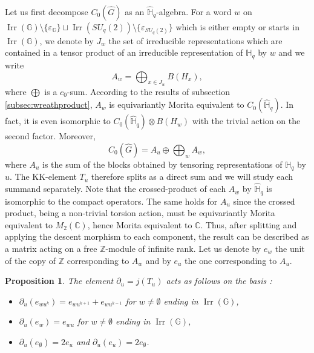 \documentclass[a4paper, 11pt]{amsart}
\theoremstyle{plain}
\newtheorem{prop}[thm]{Proposition}
\theoremstyle{definition}
\theoremstyle{remark}
\DeclareMathOperator{\Irr}{Irr}
\newcommand{\C}{\mathbb{C}}
\newcommand{\G}{\mathbb{G}}
\newcommand{\HH}{\mathbb{H}}
\newcommand{\Z}{\mathbb{Z}}
\begin{document}
Let us first decompose $C_{0}(\widehat{G})$ as an $\widehat{\HH}_{q}$-algebra. For a word $w$ on $\Irr(\G)\setminus\{\varepsilon_{\G}\}\sqcup\Irr(SU_{q}(2))\setminus\{\varepsilon_{SU_{q}(2)}\}$ which is either empty or starts in $\Irr(\G)$, we denote by $J_{w}$ the set of irreducible representations which are contained in a tensor product of an irreducible representation of $\HH_{q}$ by $w$ and we write
\begin{equation*}
A_{w} = \bigoplus_{x\in J_{w}}B(H_{x}),
\end{equation*}
where $\bigoplus$ is a $c_{0}$-sum. According to the results of subsection \ref{subsec:wreathproduct}, $A_{w}$ is equivariantly Morita equivalent to $C_{0}(\widehat{\HH}_{q})$. In fact, it is even isomorphic to $C_{0}(\widehat{\HH}_{q})\otimes B(H_{w})$ with the trivial action on the second factor. Moreover,
\begin{equation*}
C_{0}(\widehat{G}) = A_{u}\oplus\bigoplus_{w} A_{w},
\end{equation*}
where $A_{u}$ is the sum of the blocks obtained by tensoring representations of $\HH_{q}$ by $u$. The KK-element $T_{u}$ therefore splits as a direct sum and we will study each summand separately. Note that the crossed-product of each $A_{w}$ by $\widehat{\HH}_{q}$ is isomorphic to the compact operators. The same holds for $A_{u}$ since the crossed product, being a non-trivial torsion action, must be equivariantly Morita equivalent to $M_{2}(\C)$, hence Morita equivalent to $\C$. Thus, after splitting and applying the descent morphism to each component, the result can be described as a matrix acting on a free $\Z$-module of infinite rank. Let us denote by $e_{w}$ the unit of the copy of $\Z$ corresponding to $A_{w}$ and by $e_{u}$ the one corresponding to $A_{u}$.

\begin{prop}\label{prop:descentsuq}
The element $\partial_{u} = j(T_{u})$ acts as follows on the basis :
\begin{itemize}
\item $\partial_{u}(e_{wu^{k}}) = e_{wu^{k+1}} + e_{wu^{k-1}}$ for $w\neq\emptyset$ ending in $\Irr(\G)$,
\item $\partial_{u}(e_{w}) = e_{wu}$ for $w\neq\emptyset$ ending in $\Irr(\G)$,
\item $\partial_{u}(e_{\emptyset}) = 2e_{u}$ and $\partial_{u}(e_{u}) = 2e_{\emptyset}$.
\end{itemize}
\end{prop}
\end{document}
